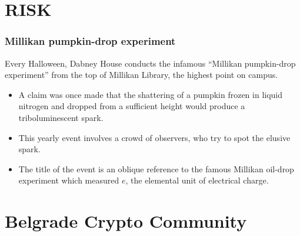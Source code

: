 \documentclass[hyperref={bookmarks=false},aspectratio=169]{beamer}
\begin{document}
\section{RISK}

\begin{frame}
\frametitle{Millikan pumpkin-drop experiment}
Every Halloween, Dabney House conducts the infamous ``Millikan pumpkin-drop experiment'' from the top of Millikan Library, the highest point on campus.

\begin{itemize}
    \item A claim was once made that the shattering of a pumpkin frozen in liquid nitrogen and dropped from a sufficient height would produce a triboluminescent spark. 
    \item This yearly event involves a crowd of observers, who try to spot the elusive spark.
    \item The title of the event is an oblique reference to the famous Millikan oil-drop experiment which measured $e$, the elemental unit of electrical charge.
\end{itemize}

\end{frame}


\section{Belgrade Crypto Community}
\end{document}
